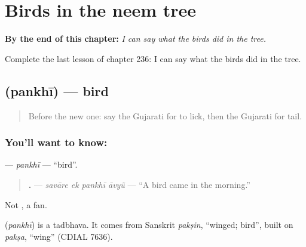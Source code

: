 
\chapter{Birds in the neem tree}
\label{ch:gu-birds-in-the-neem-tree}

\begin{chapteropening}
\textbf{By the end of this chapter:} \emph{I can say what the birds did in the tree.}

Complete the last lesson of chapter 236: I can say what the birds did in the tree.
\end{chapteropening}

\section[\texorpdfstring{\gu{પંખી} (pankhī)}{પંખી (pankhī)}]{ (pankhī) — bird}

\label{lesson:GU-C236-pankhi}



\begin{quote}
Before the new one: say the Gujarati for to lick, then the Gujarati for tail.
\end{quote}

\subsection*{You'll want to know: }
\textbf{} — \emph{pankhī} — \textquotedblleft{}bird\textquotedblright{}.

\begin{quote}
\textbf{   .} — \emph{savāre ek pankhī āvyũ} — \textquotedblleft{}A bird came in the morning.\textquotedblright{}
\end{quote}

Not \textbf{}, a fan.

\begin{cousinweb}
\textbf{} (\emph{pankhī}) is a tadbhava. It comes from Sanskrit \emph{pakṣin}, \textquotedblleft{}winged; bird\textquotedblright{}, built on \emph{pakṣa}, \textquotedblleft{}wing\textquotedblright{} (CDIAL 7636).
\end{cousinweb}

